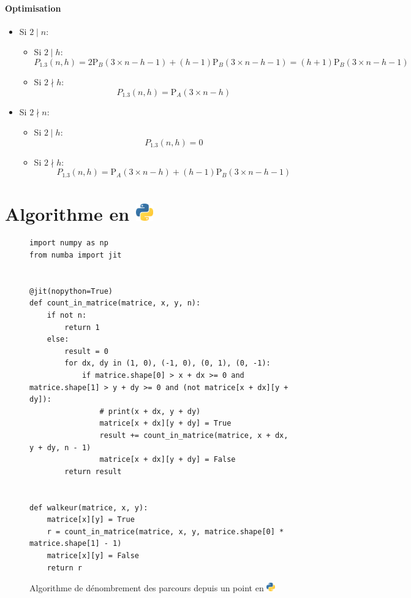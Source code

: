 \documentclass[twoside, a4paper, 12pt]{report}
\newcommand{\pythonlogo}{\includegraphics[width=1em , height=2ex]{python128.png}}
\newcommand{\pa}[2]{\ensuremath{\text{P}_A\left(#1 \times #2\right)}}
\newcommand{\pb}[2]{\ensuremath{\text{P}_B\left(#1 \times #2\right)}}
\begin{document}
\subsubsection{Optimisation}
\begin{itemize}

\item Si $2 \mid n$:
\begin{itemize}
\item Si $2 \mid h$:
$$P_{1.3}(n, h) =  2\pb{3}{n-h-1} + (h-1) \pb{3}{n-h-1} = (h+1) \pb{3}{n-h-1}$$

\item Si $2 \nmid h$:
$$P_{1.3}(n, h) =  \pa{3}{n-h}$$
\end{itemize}

\item Si $2 \nmid n$:
\begin{itemize}
\item Si $2 \mid h$:
$$P_{1.3}(n, h) = 0$$

\item Si $2 \nmid h$:
$$P_{1.3}(n, h) = \pa{3}{n-h} + (h-1) \pb{3}{n-h-1}$$

\end{itemize}
\end{itemize}

\newpage

\chapter[Algorithme en Python]{Algorithme en \pythonlogo}

\begin{figure}[h]%
\begin{lstlisting}[frame=single]
import numpy as np
from numba import jit


@jit(nopython=True)
def count_in_matrice(matrice, x, y, n):
    if not n:
        return 1
    else:
        result = 0
        for dx, dy in (1, 0), (-1, 0), (0, 1), (0, -1):
            if matrice.shape[0] > x + dx >= 0 and matrice.shape[1] > y + dy >= 0 and (not matrice[x + dx][y + dy]):
                # print(x + dx, y + dy)
                matrice[x + dx][y + dy] = True
                result += count_in_matrice(matrice, x + dx, y + dy, n - 1)
                matrice[x + dx][y + dy] = False
        return result


def walkeur(matrice, x, y):
    matrice[x][y] = True
    r = count_in_matrice(matrice, x, y, matrice.shape[0] * matrice.shape[1] - 1)
    matrice[x][y] = False
    return r
\end{lstlisting}
\caption[Algorithme de dénombrement des parcours depuis un point en Python]{Algorithme de dénombrement des parcours depuis un point en \pythonlogo}
\label{algorithme_serpent}
\end{figure}
\end{document}
